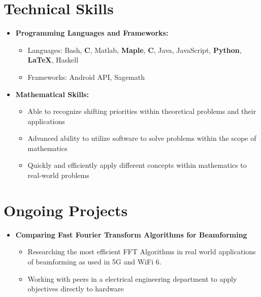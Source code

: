 \documentclass[11pt,letterpaper,sans]{moderncv}
\renewcommand{\_}{\textscale{.7}{\textunderscore}}
\newcommand{\Rplus}{\protect\hspace{-.1em}\protect\raisebox{.35ex}{\smaller{\smaller\textbf{+}}}}
\newcommand{\Cpp}{\mbox{C\Rplus\Rplus}\xspace}
\begin{document}
\section{Technical Skills}
\vspace{1em}
\begin{itemize}
\item \textbf{Programming Languages and Frameworks:}
\begin{itemize}
    \item {Languages:} Bash, \textbf{C}, Matlab, \textbf{Maple}, \textbf{\Cpp}, Java, JavaScript, \textbf{Python}, \textbf{\LaTeX}, Haskell
    \item {Frameworks:} Android API, Sagemath
\end{itemize}
\vspace{0.5em}
\item \textbf{Mathematical Skills:}
\begin{itemize}
    \item Able to recognize shifting priorities within theoretical problems and their applications
    \item Advanced ability to utilize software to solve problems within the scope of mathematics
    \item Quickly and efficiently apply different concepts within mathematics to real-world problems
\end{itemize}
\end{itemize}
\vspace{0.5em}


\section{Ongoing Projects}
\vspace{1em}
\begin{itemize}
\item \textbf{Comparing Fast Fourier Transform Algorithms for Beamforming}
\begin{itemize}
    \item Researching the most efficient FFT Algorithms in real world applications of beamforming as used in 5G and WiFi 6.
    \item Working with peers in a electrical engineering department to apply objectives directly to hardware
\end{itemize}
\end{itemize}
\vspace*{-5cm}
\end{document}
